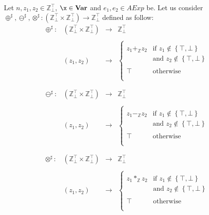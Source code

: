 \documentclass{article}
\newcommand{\var}{\textbf{Var}}
\newcommand{\ztop}{\mathbb{Z}_{\bot}^{\top}}
\newcommand{\zta}{\mathbb{Z}}
\newcommand{\pl}{\oplus^{\sharp}}
\newcommand{\tl}{\otimes^{\sharp}}
\newcommand{\ml}{\ominus^{\sharp}}
\begin{document}
Let $n, z_1, z_2 \in \ztop$, $\x \in \var$ and $e_1, e_2 \in AExp$ be. Let us consider $\pl, \ml, \tl: \left(\ztop \times \ztop\right) \longrightarrow \ztop$ defined as follow:\\
\begin{equation*}
\begin{matrix}
      \pl: & \left(\ztop \times \ztop\right) & \longrightarrow &\ztop \\\\
        & (z_1, z_2) & \longrightarrow & \left\{
\begin{array}{ll}
\\
      z_1 +_{\zta} z_2   & \text{if $z_1 \notin \left\{ \top, \bot \right\}$}\\
       & \text{and $z_2 \notin \left\{ \top, \bot \right\}$}\\\\
       \top & \text{otherwise}\\\\
        
\end{array} 
\right.\\
\\\\
      \ml: & \left(\ztop \times \ztop\right) & \longrightarrow &\ztop \\\\
        & (z_1, z_2) & \longrightarrow & \left\{
\begin{array}{ll}
\\
      z_1 -_{\zta} z_2   & \text{if $z_1 \notin \left\{ \top, \bot \right\}$}\\
       & \text{and $z_2 \notin \left\{ \top, \bot \right\}$}\\\\
       \top & \text{otherwise}\\\\
        
\end{array} 
\right.\\
\\\\
      \tl: & \left(\ztop \times \ztop\right) & \longrightarrow &\ztop \\\\
        & (z_1, z_2) & \longrightarrow & \left\{
\begin{array}{ll}
\\
      z_1 *_{\zta} z_2   & \text{if $z_1 \notin \left\{ \top, \bot \right\}$}\\
       & \text{and $z_2 \notin \left\{ \top, \bot \right\}$}\\\\
       \top & \text{otherwise}\\\\
        
\end{array} 
\right.\\
\end{matrix} 
\end{equation*}\\\\
\end{document}
